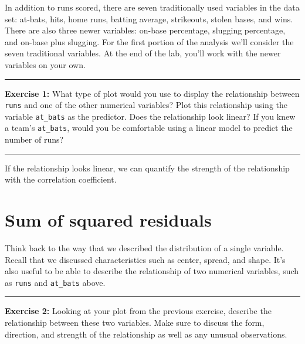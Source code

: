 \documentclass[]{book}
\newenvironment{Shaded}{\begin{snugshade}}{\end{snugshade}}
\newcommand{\KeywordTok}[1]{\textcolor[rgb]{0.13,0.29,0.53}{\textbf{#1}}}
\newcommand{\OperatorTok}[1]{\textcolor[rgb]{0.81,0.36,0.00}{\textbf{#1}}}
\newcommand{\NormalTok}[1]{#1}
\theoremstyle{definition}
\theoremstyle{definition}
\theoremstyle{definition}
\theoremstyle{remark}
\begin{document}
In addition to runs scored, there are seven traditionally used variables
in the data set: at-bats, hits, home runs, batting average, strikeouts,
stolen bases, and wins. There are also three newer variables: on-base
percentage, slugging percentage, and on-base plus slugging. For the
first portion of the analysis we'll consider the seven traditional
variables. At the end of the lab, you'll work with the newer variables
on your own.

\begin{center}\rule{0.5\linewidth}{\linethickness}\end{center}

\textbf{Exercise 1:} What type of plot would you use to display the
relationship between \texttt{runs} and one of the other numerical
variables? Plot this relationship using the variable \texttt{at\_bats}
as the predictor. Does the relationship look linear? If you knew a
team's \texttt{at\_bats}, would you be comfortable using a linear model
to predict the number of runs?

\begin{center}\rule{0.5\linewidth}{\linethickness}\end{center}

If the relationship looks linear, we can quantify the strength of the
relationship with the correlation coefficient.

\begin{Shaded}
\end{Shaded}

\section{Sum of squared residuals}\label{sum-of-squared-residuals}

Think back to the way that we described the distribution of a single
variable. Recall that we discussed characteristics such as center,
spread, and shape. It's also useful to be able to describe the
relationship of two numerical variables, such as \texttt{runs} and
\texttt{at\_bats} above.

\begin{center}\rule{0.5\linewidth}{\linethickness}\end{center}

\textbf{Exercise 2:} Looking at your plot from the previous exercise,
describe the relationship between these two variables. Make sure to
discuss the form, direction, and strength of the relationship as well as
any unusual observations.
\end{document}
